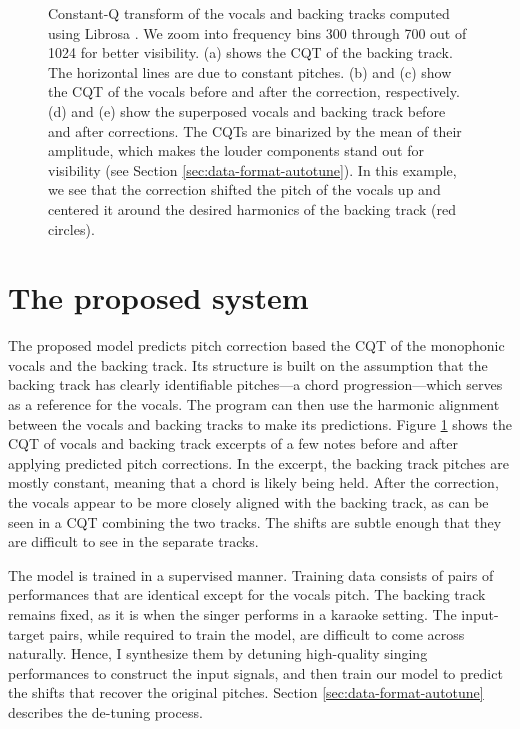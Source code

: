 \begin{figure}[t]
    \caption{
    Constant-Q transform of the vocals and backing tracks computed using Librosa \cite{mcfee2015librosa}. We zoom into frequency bins 300 through 700 out of 1024 for better visibility. (a) shows the CQT of the backing track. The horizontal lines are due to constant pitches. (b) and (c) show the CQT of the vocals before and after the correction, respectively. (d) and (e) show the superposed vocals and backing track before and after corrections. The CQTs are binarized by the mean of their amplitude, which makes the louder components stand out for visibility (see Section \ref{sec:data-format-autotune}). In this example, we see that the correction shifted the pitch of the vocals up and centered it around the desired harmonics of the backing track (red circles). 
    }
    \label{fig:model-input-autotune}
\end{figure}

\section{The proposed system}
\label{sec:proposed-autotune}
The proposed model predicts pitch correction based the CQT of the monophonic vocals and the backing track. Its structure is built on the assumption that the backing track has clearly identifiable pitches---a chord progression---which serves as a reference for the vocals. The program can then use the harmonic alignment between the vocals and backing tracks to make its predictions. Figure \ref{fig:model-input-autotune} shows the CQT of vocals and backing track excerpts of a few notes before and after applying predicted pitch corrections. In the excerpt, the backing track pitches are mostly constant, meaning that a chord is likely being held. After the correction, the vocals appear to be more closely aligned with the backing track, as can be seen in a CQT combining the two tracks. The shifts are subtle enough that they are difficult to see in the separate tracks. 

The model is trained in a supervised manner. Training data consists of pairs of performances that are identical except for the vocals pitch. The backing track remains fixed, as it is when the singer performs in a karaoke setting. The input-target pairs, while required to train the model, are difficult to come across naturally. Hence, I synthesize them by detuning high-quality singing performances to construct the input signals, and then train our model to predict the shifts that recover the original pitches. Section \ref{sec:data-format-autotune} describes the de-tuning process.

